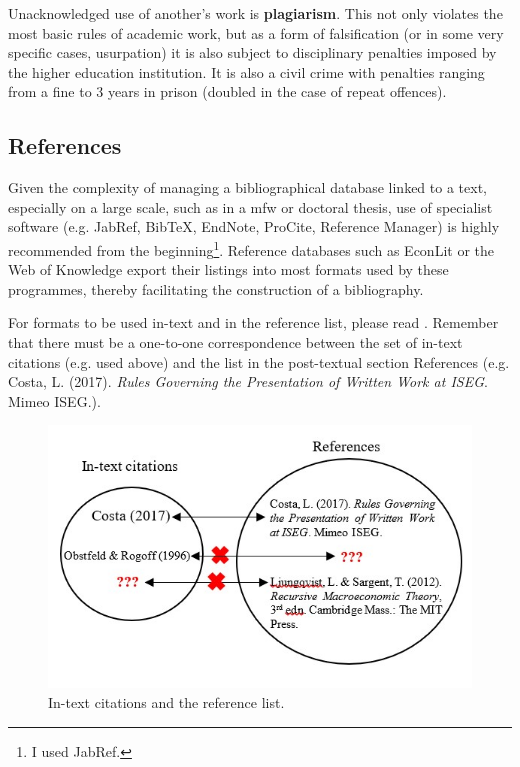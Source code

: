 \documentclass [12pt,a4paper,oneside]{article}
\begin{document}
Unacknowledged use of another's work is \textbf{plagiarism}. This not only violates the most basic rules of academic work, but as a form of falsification (or in some very specific cases, usurpation) it is also subject to disciplinary penalties imposed by the higher education institution. It is also a civil crime with penalties ranging from a fine to 3 years in prison (doubled in the case of repeat offences).

	\subsection{References}

Given the complexity of managing a bibliographical database linked to a text, especially on a large scale, such as in a \gls{mfw} or doctoral thesis, use of specialist software (e.g. JabRef, BibTeX, EndNote, ProCite, Reference Manager) is highly recommended from the beginning\footnote{I used JabRef.}. Reference databases such as EconLit or the Web of Knowledge export their listings into most formats used by these programmes, thereby facilitating the construction of a bibliography.

For formats to be used in-text and in the reference list, please read \cite{costa_2017}. Remember that there must be a one-to-one correspondence between the set of in-text citations (e.g. \cite{costa_2017} used above) and the list in the post-textual section References (e.g. Costa, L. (2017). \textit{Rules Governing the Presentation of Written Work at ISEG}. Mimeo ISEG.).


\begin{figure}[h]%
\centering

\includegraphics[scale=0.8]{citation_errors}

\caption{In-text citations and the reference list.}
\label{fig:citation_errors}

\end{figure}
\end{document}
